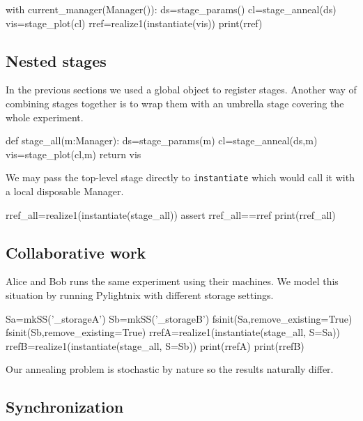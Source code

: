 \begin{pythontexcode}
with current_manager(Manager()):
  ds=stage_params()
  cl=stage_anneal(ds)
  vis=stage_plot(cl)
  rref=realize1(instantiate(vis))
  print(rref)
\end{pythontexcode}

\mystdout

\subsection{Nested stages}

In the previous sections we used a global
 object to register stages. Another way
of combining stages together is to wrap them with an umbrella stage covering the
whole experiment.

\begin{pythontexcode}
def stage_all(m:Manager):
  ds=stage_params(m)
  cl=stage_anneal(ds,m)
  vis=stage_plot(cl,m)
  return vis
\end{pythontexcode}

We may pass the top-level stage directly to \texttt{instantiate}
which would call it with a local disposable Manager.

\begin{pythontexcode}
rref_all=realize1(instantiate(stage_all))
assert rref_all==rref
print(rref_all)
\end{pythontexcode}

\mystdout


\subsection{Collaborative work}

Alice and Bob runs the same experiment using their machines. We model
this situation by running Pylightnix with different storage settings.

\begin{pythontexcode}
Sa=mkSS('_storageA')
Sb=mkSS('_storageB')
fsinit(Sa,remove_existing=True)
fsinit(Sb,remove_existing=True)
rrefA=realize1(instantiate(stage_all, S=Sa))
rrefB=realize1(instantiate(stage_all, S=Sb))
print(rrefA)
print(rrefB)
\end{pythontexcode}

Our annealing problem is stochastic by nature so the results naturally differ.

\subsection{Synchronization}

